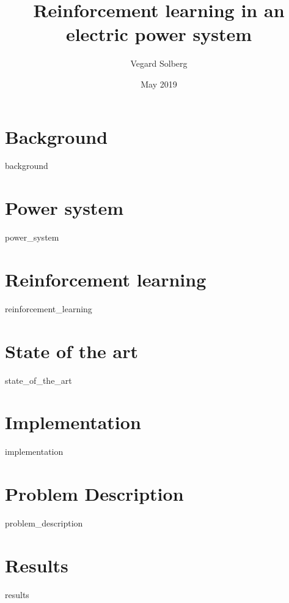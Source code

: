 \documentclass{book}
\title{Reinforcement learning in an electric power system}
\author{Vegard Solberg}
\date{May 2019}
\begin{document}
 
    \maketitle
    \tableofcontents
    
    \chapter{Background}
    {background}
    
    
    \chapter{Power system}
    {power_system}
 
    \chapter{Reinforcement learning}
    {reinforcement_learning}
    
    \chapter{State of the art}
    {state_of_the_art}
    
    \chapter{Implementation}
    {implementation}
    
    \chapter{Problem Description}
    {problem_description}
    
    \chapter{Results}
    {results}
    
    \printbibliography
\end{document}

